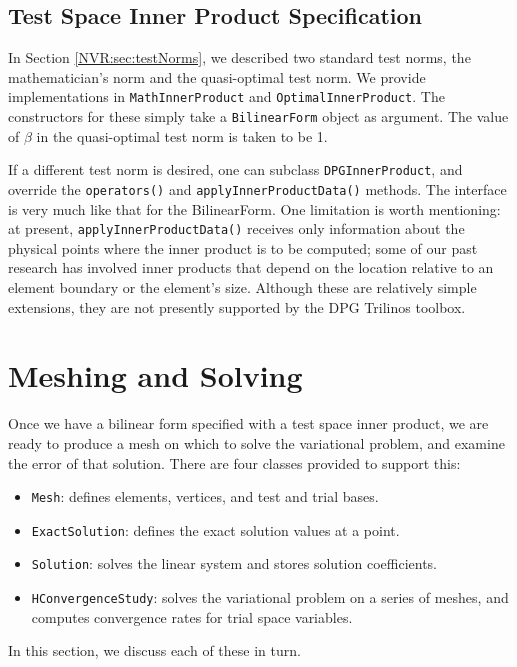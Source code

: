 \subsection{Test Space Inner Product Specification}\label{NVR:sec:innerProductSpecification}
In Section \ref{NVR:sec:testNorms}, we described two standard test norms, the mathematician's norm and the quasi-optimal test norm.  We provide implementations in \verb=MathInnerProduct= and \verb=OptimalInnerProduct=.  The constructors for these simply take a \verb=BilinearForm= object as argument.  The value of $\beta$ in the quasi-optimal test norm is taken to be 1.

If a different test norm is desired, one can subclass \verb=DPGInnerProduct=, and override the \verb=operators()= and \verb=applyInnerProductData()= methods.  The interface is very much like that for the BilinearForm.  One limitation is worth mentioning: at present, \verb=applyInnerProductData()= receives only information about the physical points where the inner product is to be computed; some of our past research has involved inner products that depend on the location relative to an element boundary or the element's size.  Although these are relatively simple extensions, they are not presently supported by the DPG Trilinos toolbox.

\section{Meshing and Solving}\label{NVR:sec:meshAndSolve}
Once we have a bilinear form specified with a test space inner product, we are ready to produce a mesh on which to solve the variational problem, and examine the error of that solution.  There are four classes provided to support this:
\begin{itemize}
\item \verb=Mesh=: defines elements, vertices, and test and trial bases. 
\item \verb=ExactSolution=: defines the exact solution values at a point.
\item \verb=Solution=: solves the linear system and stores solution coefficients.
\item \verb=HConvergenceStudy=: solves the variational problem on a series of meshes, and computes convergence rates for trial space variables.
\end{itemize}
In this section, we discuss each of these in turn.

